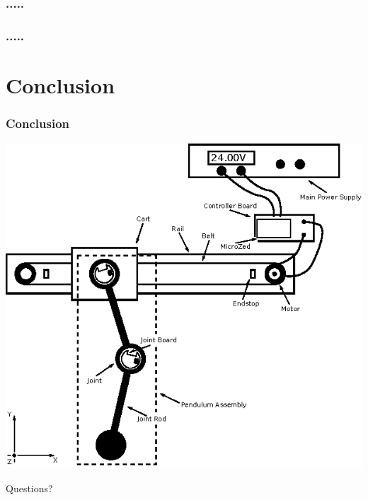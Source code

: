 \documentclass[mathserif]{beamer}
\begin{document}
\begin{frame}[c]\frametitle{.....}
    \begin{figure}[h]
		\centering
		
	\end{figure}
\end{frame}


\begin{frame}[c]\frametitle{.....}
    \begin{figure}[h]
		\centering
		
	\end{figure}
\end{frame}



\section{Conclusion}

\begin{frame}[t]\frametitle{Conclusion}
	\centering
	\includegraphics[scale=1.1]{graphics/system_overview}
\end{frame}

\begin{frame}[standout]
  Questions?
\end{frame}
\end{document}
